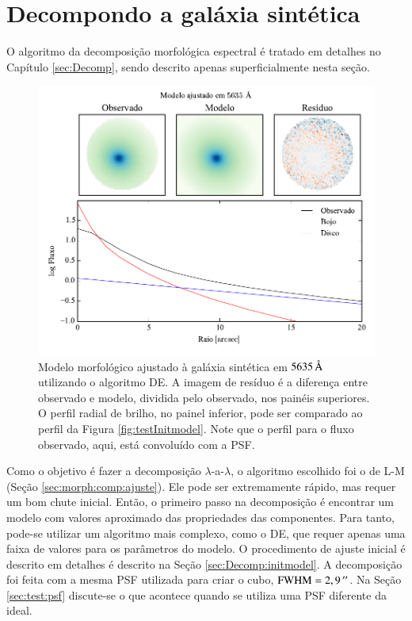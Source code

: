 \section{Decompondo a galáxia sintética}

O algoritmo da decomposição morfológica espectral é tratado em detalhes no
Capítulo \ref{sec:Decomp}, sendo descrito apenas superficialmente nesta seção.

\begin{figure}
	\includegraphics{figuras/simulation_fitmodel}
	\caption[Modelo morfológico inicial do ajuste da galáxia sintética]
	{Modelo morfológico ajustado à galáxia sintética em $5635\,\text{\normalfont\AA}$
	utilizando o algoritmo DE. A imagem de resíduo é a diferença entre
	observado e modelo, dividida pelo observado, nos painéis superiores. O perfil
	radial de brilho, no painel inferior, pode ser comparado ao perfil da Figura
	\ref{fig:testInitmodel}. Note que o perfil para o fluxo observado, aqui, está
	convoluído com a PSF.}
	\label{fig:testFitmodel}
\end{figure}

Como o objetivo é fazer a decomposição $\lambda$-a-$\lambda$, o algoritmo
escolhido foi o de L-M (Seção \ref{sec:morph:comp:ajuste}). Ele pode ser
extremamente rápido, mas requer um bom chute inicial. Então, o primeiro passo
na decomposição é encontrar um modelo com valores aproximado das propriedades
das componentes. Para tanto, pode-se utilizar um algoritmo mais complexo, como o
DE, que requer apenas uma faixa de valores para os parâmetros do modelo.
O procedimento de ajuste inicial é descrito em detalhes é descrito na Seção
\ref{sec:Decomp:initmodel}. A decomposição foi feita com a mesma PSF utilizada
para criar o cubo, $\mathrm{FWHM} = 2,9\,^{\prime\prime}$. Na Seção \ref{sec:test:psf}
discute-se o que acontece quando se utiliza uma PSF diferente da ideal.

